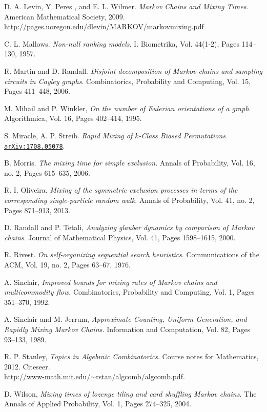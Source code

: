 \documentclass[10 pt]{article}
\newcommand{\arx}[1]{\href{http://arxiv.org/abs/#1}{\texttt{arXiv:#1}}}
\begin{document}
\begin{thebibliography}{10}
 D. A. Levin, Y. Peres , and E. L. Wilmer. \emph{Markov Chains and Mixing Times.}  American Mathematical Society, 2009.\\
\href{http://pages.uoregon.edu/dlevin/MARKOV/markovmixing.pdf}{http://pages.uoregon.edu/dlevin/MARKOV/markovmixing.pdf}

C. L. Mallows.\emph{ Non-null ranking models}. I. Biometrika, Vol. 44(1-2), Pages 114--130, 1957.

  R. Martin and D. Randall. \emph{Disjoint decomposition of Markov chains and sampling circuits in Cayley graphs}.
Combinatorics, Probability and Computing, Vol. 15, Pages 411--448, 2006.

 M. Mihail and P. Winkler, \emph{ On the number of Eulerian orientations of a graph}.  Algorithmica, Vol. 16, Pages 402--414, 1995.

 S. Miracle, A. P. Streib. \emph{Rapid Mixing of $k$-Class Biased Permutations}
\arx{1708.05078}.

B. Morris.\emph{
The mixing time for simple exclusion}.
Annals of Probability, Vol. 16, no. 2, Pages 615--635, 2006.

R. I. Oliveira. \emph{
Mixing of the symmetric exclusion processes in terms of the corresponding single-particle random walk}. Annals of Probability,
 Vol. 41, no. 2, Pages 871--913, 2013.

  D. Randall and P. Tetali, \emph{Analyzing glauber dynamics by comparison of Markov chains}.
Journal of Mathematical Physics, Vol. 41, Pages 1598--1615, 2000.

 R. Rivest.  \emph{On self-organizing sequential search heuristics}. Communications of the ACM, Vol. 19, no. 2, Pages 63--67, 1976.

 A. Sinclair, \emph{Improved bounds for mixing rates of Markov chains and multicommodity flow}. Combinatorics, Probability and Computing, Vol. 1,  Pages 351--370, 1992.

 A. Sinclair and M. Jerrum, \emph{Approximate Counting, Uniform Generation, and Rapidly Mixing Markov Chains.} Information and Computation, Vol. 82, Pages 93--133, 1989.

  R. P. Stanley, \emph{Topics in Algebraic  Combinatorics}. Course notes for Mathematics, 2012. Citeseer.\\
\href{http://www-math.mit.edu/~rstan/algcomb/algcomb.pdf}{ http://www-math.mit.edu/$\sim$rstan/algcomb/algcomb.pdf}.

 D. Wilson, \emph{Mixing times of lozenge tiling and card shuffling Markov chains.} The Annals of
Applied Probability, Vol. 1, Pages 274--325, 2004.

\end{thebibliography}
\end{document}

